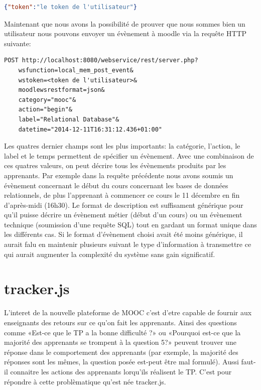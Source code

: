 \documentclass[a4paper,11pt]{report}
\begin{document}
\begin{lstlisting}[language=json, caption={Retourne le token}]
{"token":"le token de l'utilisateur"}
\end{lstlisting}

Maintenant que nous avons la possibilité de prouver que nous sommes bien un utilisateur nous pouvons envoyer un évènement à moodle via la requête HTTP suivante:

\begin{lstlisting}[caption={Soumet un évènement}]
POST http://localhost:8080/webservice/rest/server.php?
    wsfunction=local_mem_post_event&
    wstoken=<token de l'utilisateur>&
    moodlewsrestformat=json&
    category="mooc"&
    action="begin"&
    label="Relational Database"&
    datetime="2014-12-11T16:31:12.436+01:00"
\end{lstlisting}

Les quatres dernier champs sont les plus importants: la catégorie, l'action, le label et le temps permettent de spécifier un évènement. Avec une combinaison de ces quatres valeurs, on peut décrire tous les évènements produits par les apprenants. Par exemple dans la requête précédente nous avons soumis un évènement concernant le début du cours concernant les bases de données relationnels, de plus l'apprenant à commencer ce cours le 11 décembre en fin d'après-midi (16h30).
Le format de description est suffisament générique pour qu'il puisse décrire un évènement métier (début d'un cours) ou un évènement technique (soumission d'une requête SQL) tout en gardant un format unique dans les différents cas. Si le format d'évènement choisi avait été moins générique, il aurait falu en maintenir plusieurs suivant le type d'information à transmettre ce qui aurait augmenter la complexité du système sans gain significatif.

\section{tracker.js}

L'interet de la nouvelle plateforme de MOOC c'est d'etre capable de fournir aux enseignants des retours sur ce qu'on fait les apprenants. Ainsi des questions comme «Est-ce que le TP a la bonne difficulté ?» ou «Pourquoi est-ce que la majorité des apprenants se trompent à la question 5?» peuvent trouver une réponse dans le comportement des apprenants (par exemple, la majorité des réponses sont les mêmes, la question posée est-peut être mal formulé). Aussi faut-il connaitre les actions des apprenants lorqu'ils réalisent le TP.
C'est pour répondre à cette problèmatique qu'est née tracker.js.
\end{document}
